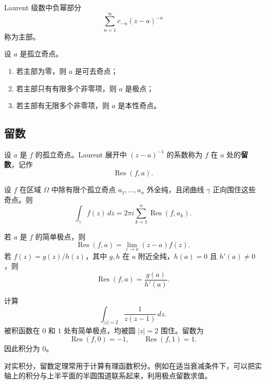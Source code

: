 \begin{definition}[主部]
Laurent 级数中负幂部分
\[
    \sum_{n=1}^{\infty}c_{-n}(z-a)^{-n}
\]
称为主部。
\end{definition}

\begin{proposition}
设 $a$ 是孤立奇点。
\begin{enumerate}
    \item 若主部为零，则 $a$ 是可去奇点；
    \item 若主部只有有限多个非零项，则 $a$ 是极点；
    \item 若主部有无限多个非零项，则 $a$ 是本性奇点。
\end{enumerate}
\end{proposition}

\subsection{留数}

\begin{definition}[留数]
设 $a$ 是 $f$ 的孤立奇点。Laurent 展开中 $(z-a)^{-1}$ 的系数称为 $f$ 在 $a$ 处的\textbf{留数}，记作
\[
    \operatorname{Res}(f,a).
\]
\end{definition}

\begin{theorem}[留数定理]
设 $f$ 在区域 $\Omega$ 中除有限个孤立奇点 $a_1,\dots,a_n$ 外全纯，且闭曲线 $\gamma$ 正向围住这些奇点。则
\[
    \int_\gamma f(z)\,dz
    =2\pi i\sum_{k=1}^n \operatorname{Res}(f,a_k).
\]
\end{theorem}

\begin{proposition}[简单极点的留数]
若 $a$ 是 $f$ 的简单极点，则
\[
    \operatorname{Res}(f,a)=\lim_{z\to a}(z-a)f(z).
\]
若 $f(z)=g(z)/h(z)$，其中 $g,h$ 在 $a$ 附近全纯，$h(a)=0$ 且 $h'(a)\ne0$，则
\[
    \operatorname{Res}(f,a)=\frac{g(a)}{h'(a)}.
\]
\end{proposition}

\begin{example}
计算
\[
    \int_{|z|=2}\frac{1}{z(z-1)}\,dz.
\]
被积函数在 $0$ 和 $1$ 处有简单极点，均被圆 $|z|=2$ 围住。留数为
\[
    \operatorname{Res}(f,0)=-1,
    \qquad
    \operatorname{Res}(f,1)=1.
\]
因此积分为 $0$。
\end{example}

\begin{example}
对实积分，留数定理常用于计算有理函数积分。例如在适当衰减条件下，可以把实轴上的积分与上半平面的半圆围道联系起来，利用极点留数求值。
\end{example}

